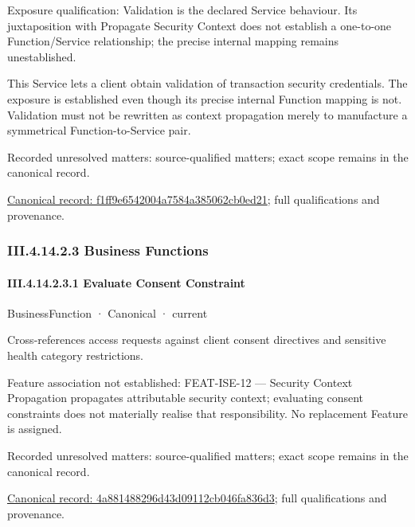 Exposure qualification: Validation is the declared Service behaviour. Its juxtaposition with Propagate Security Context does not establish a one-to-one Function/Service relationship; the precise internal mapping remains unestablished.



This Service lets a client obtain validation of transaction security credentials. The exposure is established even though its precise internal Function mapping is not. Validation must not be rewritten as context propagation merely to manufacture a symmetrical Function-to-Service pair.


{\small Recorded unresolved matters: source-qualified matters; exact scope remains in the canonical record.}\par
{\footnotesize \href{../../../../continuum/business/business-service/f1ff9e6542004a7584a385062cb0ed21.md}{Canonical record: f1ff9e6542004a7584a385062cb0ed21}; full qualifications and provenance.}\par
\subsubsection*{III.4.14.2.3 Business Functions}
\label{navigation:III.4.14.2.3}

\paragraph*{III.4.14.2.3.1 Evaluate Consent Constraint}
\label{navigation:III.4.14.2.3.1}

\label{element:4a881488296d43d09112cb046fa836d3}
{\small BusinessFunction · Canonical · current}\par

Cross-references access requests against client consent directives and sensitive health category restrictions.



Feature association not established: FEAT-ISE-12 — Security Context Propagation propagates attributable security context; evaluating consent constraints does not materially realise that responsibility. No replacement Feature is assigned.


{\small Recorded unresolved matters: source-qualified matters; exact scope remains in the canonical record.}\par
{\footnotesize \href{../../../../continuum/business/business-function/4a881488296d43d09112cb046fa836d3.md}{Canonical record: 4a881488296d43d09112cb046fa836d3}; full qualifications and provenance.}\par
